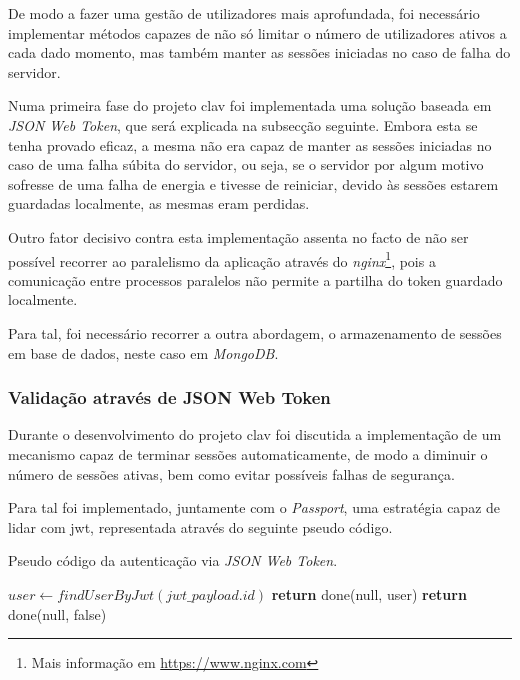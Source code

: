 De modo a fazer uma gestão de utilizadores mais aprofundada, foi necessário implementar métodos capazes de não só limitar o número de utilizadores ativos a cada dado momento, mas também manter as sessões iniciadas no caso de falha do servidor.

Numa primeira fase do projeto \gls{clav} foi implementada uma solução baseada em \emph{JSON Web Token}, que será explicada na subsecção seguinte. Embora esta se tenha provado eficaz, a mesma não era capaz de manter as sessões iniciadas no caso de uma falha súbita do servidor, ou seja, se o servidor por algum motivo sofresse de uma falha de energia e tivesse de reiniciar, devido às sessões estarem guardadas localmente, as mesmas eram perdidas.

Outro fator decisivo contra esta implementação assenta no facto de não ser possível recorrer ao paralelismo da aplicação através do \emph{nginx}\footnote{Mais informação em \url{https://www.nginx.com}}, pois a comunicação entre processos paralelos não permite a partilha do token guardado localmente.

Para tal, foi necessário recorrer a outra abordagem, o armazenamento de sessões em base de dados, neste caso em \emph{MongoDB}.

\subsubsection{Validação através de JSON Web Token}

Durante o desenvolvimento do projeto \gls{clav} foi discutida a implementação de um mecanismo capaz de terminar sessões automaticamente, de modo a diminuir o número de sessões ativas, bem como evitar possíveis falhas de segurança.

Para tal foi implementado, juntamente com o \emph{Passport}, uma estratégia capaz de lidar com \gls{jwt}, representada através do seguinte pseudo código.

\begin{algorithm}
    \caption{Pseudo código da autenticação via \emph{JSON Web Token}.}
    \begin{algorithmic}[1]
        \State $user \gets findUserByJwt(jwt\_payload.id)$
            \State \textbf{return} done(null, user)
        \Else
            \State \textbf{return} done(null, false)
        \EndIf
    \EndFunction
    \end{algorithmic}
\end{algorithm}

